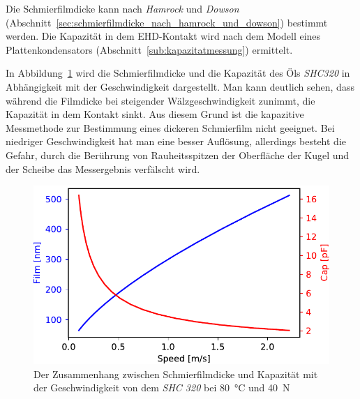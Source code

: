 Die Schmierfilmdicke kann nach \textit{Hamrock} und \textit{Dowson} (Abschnitt~\ref{sec:schmierfilmdicke_nach_hamrock_und_dowson}) bestimmt werden.
Die Kapazität in dem EHD-Kontakt wird nach dem Modell eines Plattenkondensators (Abschnitt~\ref{sub:kapazitatmessung}) ermittelt.

In Abbildung~\ref{fig:filmdicke_kapazitaet_geschwindigkeit} wird die Schmierfilmdicke und die Kapazität des Öls \textit{SHC320} in Abhängigkeit mit der Geschwindigkeit dargestellt.
Man kann deutlich sehen, dass während die Filmdicke bei steigender Wälzgeschwindigkeit zunimmt, die Kapazität in dem Kontakt sinkt.
Aus diesem Grund ist die kapazitive Messmethode zur Bestimmung eines dickeren Schmierfilm nicht geeignet.
Bei niedriger Geschwindigkeit hat man eine besser Auflösung, allerdings besteht die Gefahr, durch die Berührung von Rauheitsspitzen der Oberfläche der Kugel und der Scheibe das Messergebnis verfälscht wird.

\begin{figure}[htb]
    \centering
    \includegraphics[]{./images/film_cap_speed_80C_20N_SHC320.pdf}
    \caption{Der Zusammenhang zwischen Schmierfilmdicke und Kapazität mit der Geschwindigkeit von dem \textit{SHC 320} bei \SI{80}{\degreeCelsius} und \SI{40}{\N}}
    \label{fig:filmdicke_kapazitaet_geschwindigkeit}
\end{figure}

